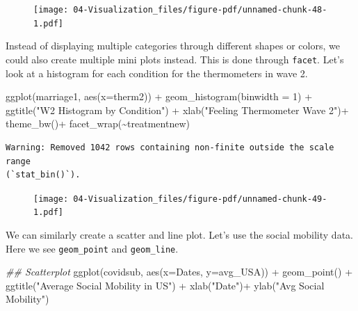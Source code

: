 \documentclass[
  letterpaper,
  DIV=11,
  numbers=noendperiod]{scrreprt}
\newenvironment{Shaded}{\begin{snugshade}}{\end{snugshade}}
\newcommand{\AttributeTok}[1]{\textcolor[rgb]{0.40,0.45,0.13}{#1}}
\newcommand{\DecValTok}[1]{\textcolor[rgb]{0.68,0.00,0.00}{#1}}
\newcommand{\DocumentationTok}[1]{\textcolor[rgb]{0.37,0.37,0.37}{\textit{#1}}}
\newcommand{\FunctionTok}[1]{\textcolor[rgb]{0.28,0.35,0.67}{#1}}
\newcommand{\NormalTok}[1]{\textcolor[rgb]{0.00,0.23,0.31}{#1}}
\newcommand{\SpecialCharTok}[1]{\textcolor[rgb]{0.37,0.37,0.37}{#1}}
\newcommand{\StringTok}[1]{\textcolor[rgb]{0.13,0.47,0.30}{#1}}
\begin{document}
\begin{figure}[H]

{\centering \texttt{[image: 04-Visualization\_files/figure-pdf/unnamed-chunk-48-1.pdf]}

}

\end{figure}

Instead of displaying multiple categories through different shapes or
colors, we could also create multiple mini plots instead. This is done
through \texttt{facet}. Let's look at a histogram for each condition for
the thermometers in wave 2.

\begin{Shaded}
\begin{Highlighting}[]
\FunctionTok{ggplot}\NormalTok{(marriage1, }\FunctionTok{aes}\NormalTok{(}\AttributeTok{x=}\NormalTok{therm2)) }\SpecialCharTok{+}
  \FunctionTok{geom\_histogram}\NormalTok{(}\AttributeTok{binwidth =} \DecValTok{1}\NormalTok{) }\SpecialCharTok{+}
  \FunctionTok{ggtitle}\NormalTok{(}\StringTok{"W2 Histogram by Condition"}\NormalTok{) }\SpecialCharTok{+}
  \FunctionTok{xlab}\NormalTok{(}\StringTok{"Feeling Thermometer Wave 2"}\NormalTok{)}\SpecialCharTok{+}
  \FunctionTok{theme\_bw}\NormalTok{()}\SpecialCharTok{+}
  \FunctionTok{facet\_wrap}\NormalTok{(}\SpecialCharTok{\textasciitilde{}}\NormalTok{treatmentnew)}
\end{Highlighting}
\end{Shaded}

\begin{verbatim}
Warning: Removed 1042 rows containing non-finite outside the scale range
(`stat_bin()`).
\end{verbatim}

\begin{figure}[H]

{\centering \texttt{[image: 04-Visualization\_files/figure-pdf/unnamed-chunk-49-1.pdf]}

}

\end{figure}

We can similarly create a scatter and line plot. Let's use the social
mobility data. Here we see \texttt{geom\_point} and \texttt{geom\_line}.

\begin{Shaded}
\begin{Highlighting}[]
\DocumentationTok{\#\# Scatterplot}
\FunctionTok{ggplot}\NormalTok{(covidsub, }\FunctionTok{aes}\NormalTok{(}\AttributeTok{x=}\NormalTok{Dates, }\AttributeTok{y=}\NormalTok{avg\_USA)) }\SpecialCharTok{+}
  \FunctionTok{geom\_point}\NormalTok{() }\SpecialCharTok{+}
  \FunctionTok{ggtitle}\NormalTok{(}\StringTok{"Average Social Mobility in US"}\NormalTok{) }\SpecialCharTok{+}
  \FunctionTok{xlab}\NormalTok{(}\StringTok{"Date"}\NormalTok{)}\SpecialCharTok{+}
  \FunctionTok{ylab}\NormalTok{(}\StringTok{"Avg Social Mobility"}\NormalTok{)}
\end{Highlighting}
\end{Shaded}
\end{document}
